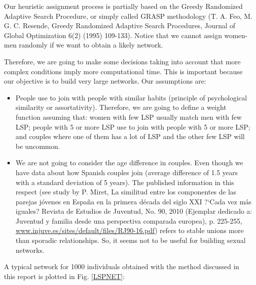 Our heuristic assignment process is partially based on the Greedy Randomized Adaptive Search Procedure, or simply called GRASP methodology (T. A. Feo, M. G. C. Resende, Greedy Randomized Adaptive Search Procedures, Journal of Global Optimization 6(2) (1995) 109-133). Notice that we cannot assign women-men randomly if we want to obtain a likely network.

Therefore, we are going to make some decisions taking into account that more complex conditions imply more computational time. This is important because our objective is to build very large networks. Our assumptions are:

\begin{itemize}
	\item People use to join with people with similar habits (principle of psychological similarity or assortativity). Therefore, we are going to define a weight function assuming that: women with few LSP usually match men with few LSP; people with 5 or more LSP use to join with people with 5 or more LSP; and couples where one of them has a lot of LSP and the other few LSP will be uncommon.

	\item We are not going to consider the age difference in couples. Even though we have data about how Spanish couples join (average difference of 1.5 years with a standard deviation of 5 years). The published information in this respect  (see study by P. Miret,  La similitud entre los componentes de las parejas j\'ovenes en Espa\~{n}a en la primera d\'ecada del siglo XXI  ?`Cada vez m\'as iguales? Revista de Estudios de Juventud, No. 90, 2010 (Ejemplar dedicado a: Juventud y familia desde una perspectiva comparada europea), p. 225-255, \url{www.injuve.es/sites/default/files/RJ90-16.pdf}) refers to stable unions more than sporadic relationships. So, it seems not to be useful for building sexual networks.
\end{itemize}
A typical network for 1000 individuals obtained with the method discussed in this report is plotted in Fig. \ref{LSPNET}:
